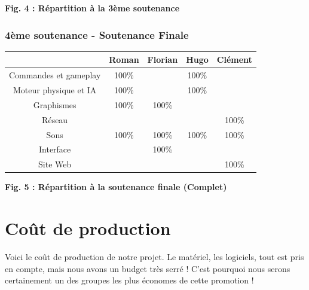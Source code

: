 \documentclass{article}
\begin{document}
\begin{center}
\bf{Fig. 4 : Répartition à la 3ème soutenance}
\end{center}

\subsubsection{4ème soutenance - Soutenance Finale}

\begin{center}
\begin{tabular}{|c|c|c|c|c|}
\hline
 & Roman & Florian & Hugo & Clément \\
\hline
Commandes et gameplay & 100\% & & 100\% & \\
\hline
Moteur physique et IA & 100\% & & 100\% & \\
\hline
Graphismes & 100\% & 100\% & & \\
\hline
Réseau & & & & 100\% \\
\hline
Sons & 100\% & 100\% & 100\% & 100\% \\
\hline
Interface & & 100\% & & \\
\hline
Site Web & & & & 100\% \\
\hline
\end{tabular}
\end{center}

\begin{center}
\bf{Fig. 5 : Répartition à la soutenance finale (Complet)}
\end{center}



\newpage
\section{Coût de production}

\par
Voici le coût de production de notre projet. Le matériel, les logiciels, tout est pris en compte, mais nous avons un budget très serré ! C'est pourquoi nous serons certainement un des groupes les plus économes de cette promotion !
\newline
\end{document}
